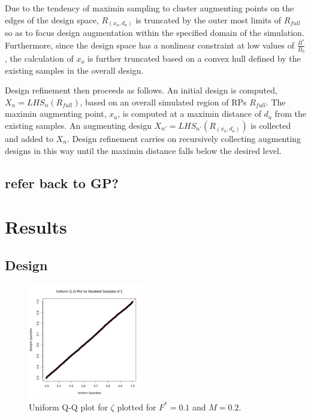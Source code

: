 %
Due to the tendency of maximin sampling to cluster augmenting points on the edges
of the design space, $R_{(x_a, d_a)}$ is truncated by the outer most limits of
$R_{full}$ so as to focus design augmentation within the specified domain of the
simulation. Furthermore, since the design space has a nonlinear constraint at low
values of $\frac{B^*}{B_0}$, the calculation of $x_a$ is further truncated
based on a convex hull defined by the existing samples in the overall design.

%
Design refinement then proceeds as follows. An initial design is computed, $X_{n} = LHS_{n}(R_{full})$, %
based on an overall simulated region of RPs $R_{full}$. The maximin augmenting
point, $x_a$, is computed at a maximin distance of $d_a$ from the existing samples.
An augmenting design $X_{n'} = LHS_{n'}(R_{(x_a, d_a)})$ is collected and
added to $X_n$. Design refinement carries on recursively collecting augmenting
designs in this way until the maximin distance falls below the desired level.

%
\subsection{\color{red}refer back to GP?}

%
\section{Results}

%
\subsection{Design}

%
\begin{figure}
\vspace{-2cm}
\includegraphics[width=0.45\textwidth]{../gpBias/qqUnif.png}
\vspace{-1cm} %
\caption{Uniform Q-Q plot for $\zeta$ plotted for $F^*=0.1$ and $M=0.2$.}
\label{qqZeta}
\end{figure}

